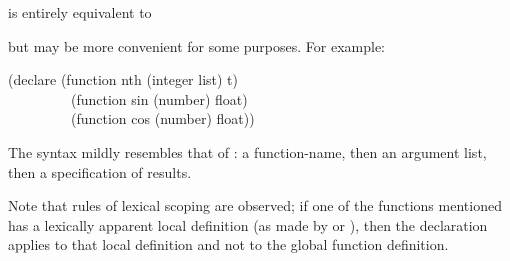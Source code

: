 \begin{obsolete}
\begin{flushdesc}
\item[\cdf{function}]
is entirely equivalent to
\begin{lisp}
\end{lisp}
but may be more convenient for some purposes.
For example:
\begin{lisp}
(declare (function nth (integer list) t) \\
~~~~~~~~~(function sin (number) float) \\
~~~~~~~~~(function cos (number) float))
\end{lisp}
The syntax mildly resembles that of : a function-name,
then an argument list, then a specification of results.

Note that rules of lexical scoping are observed; if one of the functions
mentioned has a lexically apparent local definition
(as made by  or ), then the declaration
applies to that local definition and not to the global function definition.
\end{flushdesc}
\end{obsolete}

